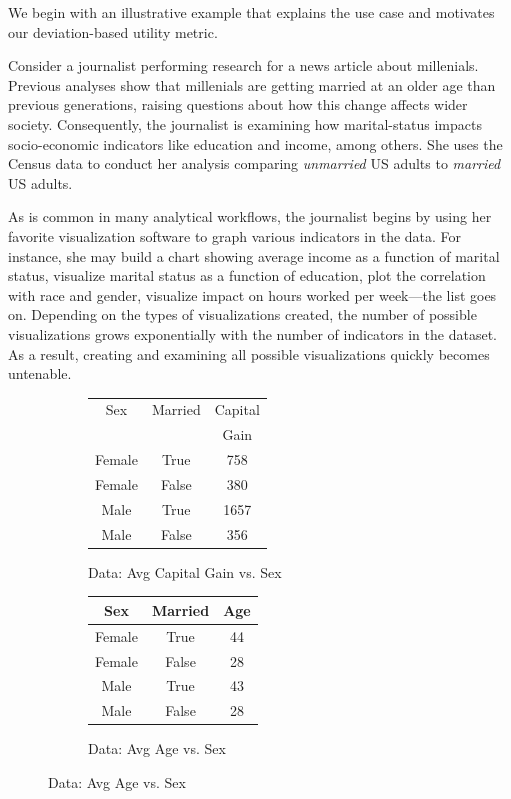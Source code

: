 We begin with an illustrative example that explains the \SeeDB use case and motivates our deviation-based
utility metric. 
\begin{example}
Consider a journalist performing research for a news article about millenials.
Previous analyses show that millenials are getting married at an older age than 
previous generations, raising questions about how this change affects
wider society.
Consequently, the journalist is examining how marital-status
impacts socio-economic indicators like education and income, among others.
She uses the Census data to conduct her analysis comparing {\em unmarried} US adults
to {\em married} US adults.

As is common in many analytical workflows, the journalist begins by using her favorite 
visualization software to graph various indicators in the data.
For instance, she may build a chart showing average income as a function of marital status,
visualize marital status as a function of education, plot the correlation with race and gender,
visualize impact on hours worked per week---the list goes on.
Depending on the types of visualizations created, the number of possible 
visualizations grows exponentially with the number of indicators in the dataset.
As a result, creating and examining all possible visualizations
quickly becomes untenable.

\begin{figure}[h]
\vspace{-7pt}
	\centering
	\begin{subfigure}{0.49\linewidth}
	   \begin{tabular}{ccc} \hline
	   	Sex  &   Married & Capital \\
	   	 & & Gain  \\ \hline
		Female & True  &  758 \\ \hline
		Female & False &  380 \\ \hline
		Male   & True  &  1657 \\ \hline
		Male   & False &  356 \\ \hline
	  \end{tabular}
		  \caption{Data: Avg Capital Gain vs. Sex} \label{tab:interesting_viz}
	\end{subfigure}
	\begin{subfigure}{0.49\linewidth}
	   \begin{tabular}{ccc} \hline
	   	Sex  &   Married & Age \\ \hline
		Female & True  &  44 \\ \hline
		Female & False &  28 \\ \hline
		Male   & True  &  43 \\ \hline
		Male   & False &  28 \\ \hline
	  \end{tabular}
	  \caption{Data: Avg Age vs. Sex} \label{tab:uninteresting_viz}
	\end{subfigure}
	

\end{figure}
\end{example}
